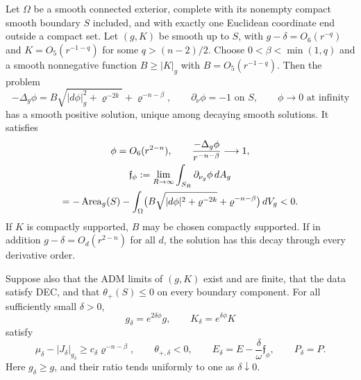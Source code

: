 \begin{lemma}[Strictification]\label{lem:end:strict}
Let $\Omega$ be a smooth connected exterior, complete with its
nonempty compact smooth boundary $S$ included, and with exactly one
Euclidean coordinate end outside a compact set.  Let $(g,K)$ be
smooth up to $S$, with $g-\delta=O_6(r^{-q})$ and
$K=O_5(r^{-1-q})$ for some $q>(n-2)/2$.  Choose $0<\beta<\min(1,q)$ and a smooth
nonnegative function $B\ge|K|_g$ with
$B=O_5(r^{-1-q})$.  Then the problem
\begin{equation}\label{eq:end:strict-pde}
 -\Delta_g\phi
 =B\sqrt{|d\phi|_g^2+\varrho^{-2k}}+\varrho^{-n-\beta},
 \qquad \partial_\nu\phi=-1\text{ on }S,
 \qquad \phi\longrightarrow0\text{ at infinity}
\end{equation}
has a smooth positive solution, unique among decaying smooth
solutions.  It satisfies
\begin{equation}\label{eq:end:strict-estimates}
\begin{gathered}
 \phi=O_6(r^{2-n}),\qquad
 \frac{-\Delta_g\phi}{r^{-n-\beta}}\longrightarrow1,\\
 \mathfrak f_\phi:=\lim_{R\to\infty}
          \int_{S_R}\partial_{\nu_g}\phi\,dA_g\\
 =-\operatorname{Area}_g(S)-\int_\Omega
       \bigl(B\sqrt{|d\phi|^2+\varrho^{-2k}}
                    +\varrho^{-n-\beta}\bigr)\,dV_g<0.
\end{gathered}
\end{equation}
If $K$ is compactly supported, $B$ may be chosen compactly
supported.  If in addition $g-\delta=O_d(r^{2-n})$ for all $d$,
the solution has this decay through every derivative order.

Suppose also that the ADM limits of $(g,K)$ exist and are finite,
that the data satisfy DEC, and that $\theta_+(S)\le0$ on every
boundary component.  For all sufficiently small $\delta>0$,
\[
 g_\delta=e^{2\delta\phi}g,\qquad
 K_\delta=e^{\delta\phi}K
\]
satisfy
\begin{equation}\label{eq:end:strict-margin}
 \mu_\delta-|J_\delta|_{g_\delta}\ge c_\delta\varrho^{-n-\beta},
 \qquad \theta_{+,\delta}<0,
 \qquad E_\delta=E-\frac{\delta}{\omega}\mathfrak f_\phi,
 \qquad P_\delta=P.
\end{equation}
Here $g_\delta\ge g$, and their ratio tends uniformly to one
as $\delta\downarrow0$.
\end{lemma}

